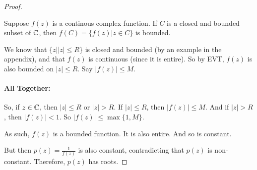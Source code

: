 \begin{proof}
\begin{lem} Suppose $f(z)$ is a continous complex function. If $C$ is a closed and bounded subset of $\mathbb{C}$, then $f(C) = \{f(z)|z\in C\}$ is bounded.\end{lem}

We know that $\{z||z|\le R\}$ is closed and bounded (by an example in the appendix), and that $f(z)$ is continuous (since it is entire). So by EVT, $f(z)$ is also bounded on $|z| \le R$. Say $|f(z)| \le M$.

\paragraph{All Together:} So, if $z\in \mathbb{C}$, then $|z| \le R$ or $|z| > R$. If $|z| \le R$, then $|f(z)| \le M$. And if $|z| > R$, then $|f(z)| < 1$. So $|f(z)| \le \max\{1,M\}$.

As such, $f(z)$ is a bounded function. It is also entire. And so is constant.

But then $p(z) = \frac{1}{f(z)}$ is also constant, contradicting that $p(z)$ is non-constant. Therefore, $p(z)$ has roots.

\end{proof}

